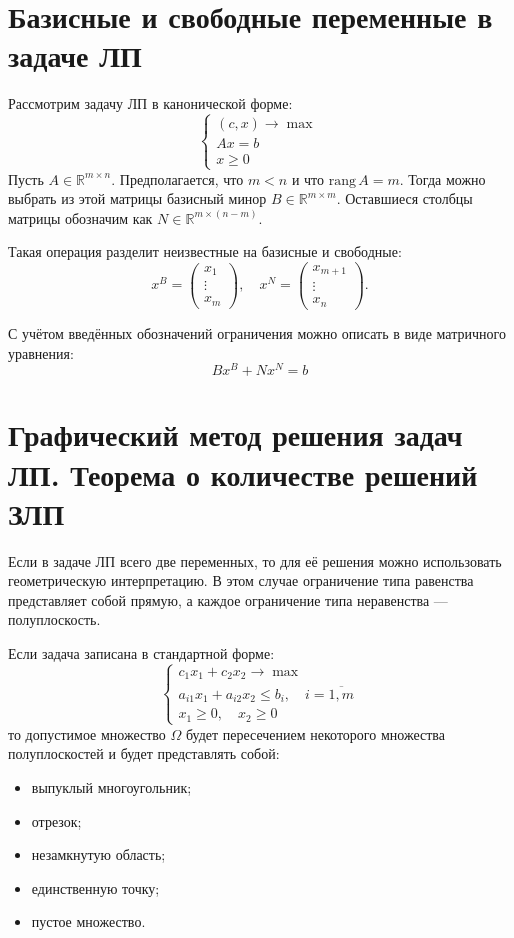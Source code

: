 \documentclass[17pt]{extarticle}
\begin{document}
\section{Базисные и свободные переменные в задаче ЛП}

Рассмотрим задачу ЛП в канонической форме:
\[
    \begin{cases}
        (c, x) \to \max \\
        A x = b         \\
        x \ge 0
    \end{cases}
\]
Пусть \( A \in \mathbb{R}^{m \times n} \). Предполагается, что \( m < n \) и что \( \text{rang}\, A = m \). Тогда можно выбрать из этой матрицы базисный минор \( B \in \mathbb{R}^{m \times m} \). Оставшиеся столбцы матрицы обозначим как \( N \in \mathbb{R}^{m \times (n - m)} \).

Такая операция разделит неизвестные на базисные и свободные:
\[
    x^B = \begin{pmatrix} x_1 \\ \vdots \\ x_m \end{pmatrix}, \quad
    x^N = \begin{pmatrix} x_{m+1} \\ \vdots \\ x_n \end{pmatrix}.
\]

С учётом введённых обозначений ограничения можно описать в виде матричного уравнения:
\[
    B x^B + N x^N = b
\]




\section{Графический метод решения задач ЛП. Теорема о количестве решений ЗЛП}

Если в задаче ЛП всего две переменных, то для её решения можно использовать геометрическую интерпретацию. В этом случае ограничение типа равенства представляет собой прямую, а каждое ограничение типа неравенства — полуплоскость.

Если задача записана в стандартной форме:
\[
    \begin{cases}
        c_1 x_1 + c_2 x_2 \to \max                                \\
        a_{i1} x_1 + a_{i2} x_2 \le b_i, \quad i = \overline{1,m} \\
        x_1 \ge 0, \quad x_2 \ge 0
    \end{cases}
\]
то допустимое множество \( \Omega \) будет пересечением некоторого множества полуплоскостей и будет представлять собой:
\begin{itemize}
    \item выпуклый многоугольник;
    \item отрезок;
    \item незамкнутую область;
    \item единственную точку;
    \item пустое множество.
\end{itemize}
\end{document}
